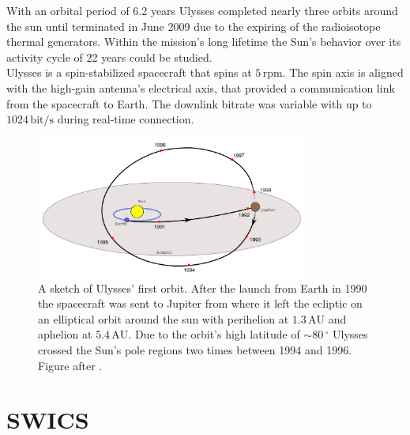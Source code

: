 With an orbital period of 6.2 years Ulysses completed nearly three orbits around the sun until terminated in June 2009 due to the expiring of the radioisotope thermal generators.
Within the mission's long lifetime the Sun's behavior over its activity cycle of 22 years could be studied.\\
Ulysses is a spin-stabilized spacecraft that spins at $5\,\mathrm{rpm}$. The spin axis is aligned with the high-gain antenna's electrical axis, that provided a communication link from the spacecraft to Earth. The downlink bitrate was variable with up to $1024\,\mathrm{bit/s}$ during real-time connection.
\begin{figure}[h]
	\includegraphics[width=0.8\textwidth]{Figures/ulysses_trajectory.pdf}
	\centering
	\caption{A sketch of Ulysses' first orbit. After the launch from Earth in 1990 the spacecraft was sent to Jupiter from where it left the ecliptic on an elliptical orbit around the sun with perihelion at $1.3\,\mathrm{AU}$ and aphelion at $5.4\,\mathrm{AU}$. Due to the orbit's high latitude of $\sim 80 \, ^\circ$ Ulysses crossed the Sun's pole regions two times between 1994 and 1996. Figure after \citet{esa_orbit}.}
	\label{fig:trajectory}
\end{figure}
%
%
%
%
%
\section{SWICS}
\label{sec:swics}


